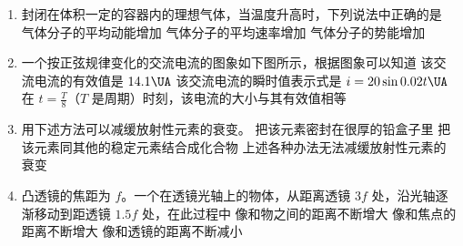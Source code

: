 \documentclass[\gkver]{gaokaozhenti}
\begin{document}
\begin{enumerate}

\item
封闭在体积一定的容器内的理想气体，当温度升高时，下列说法中正确的是
{气体分子的平均动能增加}
{气体分子的平均速率增加}
{气体分子的势能增加}


\gknewpage

\item
一个按正弦规律变化的交流电流的图象如下图所示，根据图象可以知道
\onepicture[w=4.63cm]{}
{该交流电流的有效值是 $14.1\UA$}
{该交流电流的瞬时值表示式是 $i=20\sin0.02t\UA$}
{在 $t=\frac{T}{8}$（$T$ 是周期）时刻，该电流的大小与其有效值相等}


\item
用下述方法可以减缓放射性元素的衰变。
{把该元素密封在很厚的铅盒子里}
{把该元素同其他的稳定元素结合成化合物}
{上述各种办法无法减缓放射性元素的衰变}


\item
凸透镜的焦距为 $f$。一个在透镜光轴上的物体，从距离透镜 $3f$ 处，沿光轴逐渐移动到距透镜 $1.5f$ 处，在此过程中
{像和物之间的距离不断增大}
{像和焦点的距离不断增大}
{像和透镜的距离不断减小}


\end{enumerate}
\end{document}
